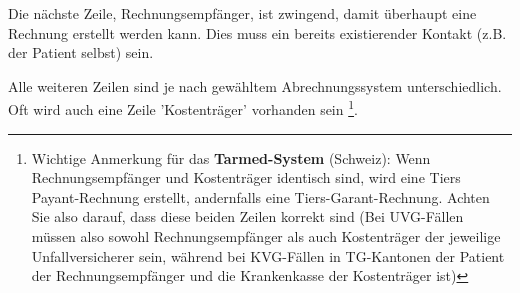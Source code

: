 Die nächste Zeile, Rechnungsempfänger, ist zwingend, damit überhaupt eine Rechnung erstellt werden kann. Dies muss ein bereits existierender Kontakt (z.B. der Patient selbst) sein.

\medskip
Alle weiteren Zeilen sind je nach gewähltem Abrechnungssystem unterschiedlich. Oft wird auch eine Zeile 'Kostenträger' vorhanden sein \footnote{Wichtige Anmerkung für das \textbf{Tarmed-System} (Schweiz): Wenn Rechnungsempfänger und Kostenträger identisch sind, wird eine Tiers Payant-Rechnung erstellt, andernfalls eine Tiers-Garant-Rechnung. Achten Sie also darauf, dass diese beiden Zeilen korrekt sind (Bei UVG-Fällen müssen also sowohl Rechnungsempfänger als auch Kostenträger der jeweilige Unfallversicherer sein, während bei KVG-Fällen in TG-Kantonen der Patient der Rechnungsempfänger und die Krankenkasse der Kostenträger ist)}.

\clearpage

